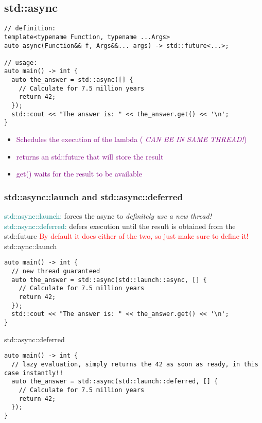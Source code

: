 \documentclass[main.tex,fontsize=8pt,paper=a4,paper=portrait,DIV=calc,]{scrartcl}
\begin{document}
\subsection{std::async}
\begin{lstlisting}
// definition:
template<typename Function, typename ...Args>
auto async(Function&& f, Args&&... args) -> std::future<...>;

// usage:
auto main() -> int {
  auto the_answer = std::async([] {
    // Calculate for 7.5 million years
    return 42;
  });
  std::cout << "The answer is: " << the_answer.get() << '\n';
}
\end{lstlisting}
\begin{itemize}
  \item \textcolor{purple}{Schedules the execution of the lambda ( \emph{CAN BE IN SAME THREAD!})}
\item \textcolor{purple}{returns an std::future that will store the result}
\item \textcolor{purple}{get() waits for the result to be available}
\end{itemize} 

\subsubsection{std::async::launch and std::async::deferred}
\textcolor{teal}{std::async::launch:} forces the async to \emph{definitely use a new thread!}\newline
\textcolor{teal}{std::async::deferred:} defers execution until the result is obtained from the std::future\newline
\textcolor{red}{By default it does either of the two, so just make sure to define it!}\newline
std::aync::launch
\begin{lstlisting}
auto main() -> int {
  // new thread guaranteed
  auto the_answer = std::async(std::launch::async, [] {
    // Calculate for 7.5 million years
    return 42;
  });
  std::cout << "The answer is: " << the_answer.get() << '\n';
}
\end{lstlisting}
std::async::deferred
\begin{lstlisting}
auto main() -> int {
  // lazy evaluation, simply returns the 42 as soon as ready, in this case instantly!!
  auto the_answer = std::async(std::launch::deferred, [] {
    // Calculate for 7.5 million years
    return 42;
  });
}
\end{lstlisting}


\end{document}

